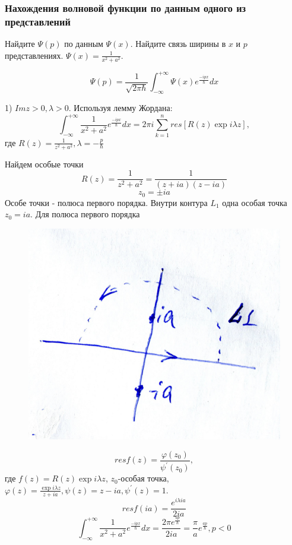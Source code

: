 \subsubsection{Нахождения волновой функции по данным одного из представлений}

Найдите $\Psi(p)$ по данным $\Psi(x)$. Найдите связь ширины в $x$ и $p$ представлениях. $\Psi(x)=\frac{1}{x^2+a^2}$.


$$\Psi(p)=\frac{1}{\sqrt{2\pi \hbar}} \int_{-\infty}^{+\infty} \Psi(x) e^{\frac{-ipx}{\hbar}}dx$$

1) $Im z>0, \lambda >0$. Используя лемму Жордана:
$$\int_{-\infty}^{+\infty} \frac{1}{x^2+a^2} e^{\frac{-ipx}{\hbar}}dx=2\pi i \sum_{k=1}^n res [R(z)\exp{i \lambda z}],$$
где $R(z)=\frac{1}{z^2+a^2}, \lambda=-\frac{p}{\hbar}$ 

Найдем особые точки 
$$R(z)= \frac{1}{z^2+a^2} = \frac{1}{(z+ia)(z-ia)}$$
$$z_0=\pm ia$$
Особе точки - полюса первого порядка. Внутри контура $L_1$ одна особая точка $z_0=ia$. Для полюса первого порядка

\begin{figure}
\includegraphics[width=\linewidth]{fig/fig83}
\caption{}
\vspace{-17pt}
\end{figure}

$$res f(z) = \frac{\varphi(z_0)}{\psi^{'}(z_0)},$$
где $f(z)=R(z)\exp{i \lambda z}$, $z_0$-особая точка, $\varphi(z)=\frac{\exp{i \lambda z}}{z+ia}, \psi(z)=z-ia, \psi^{'}(z)=1$.
$$res f(ia) = \frac{e^{i \lambda i a}}{2ia}$$
$$\int_{-\infty}^{+\infty} \frac{1}{x^2+a^2} e^{\frac{-ipx}{\hbar}}dx=\frac{2\pi e^{\frac{ap}{\hbar}}}{2ia}=\frac{\pi}{a} e^{\frac{ap}{\hbar}}, p<0$$

